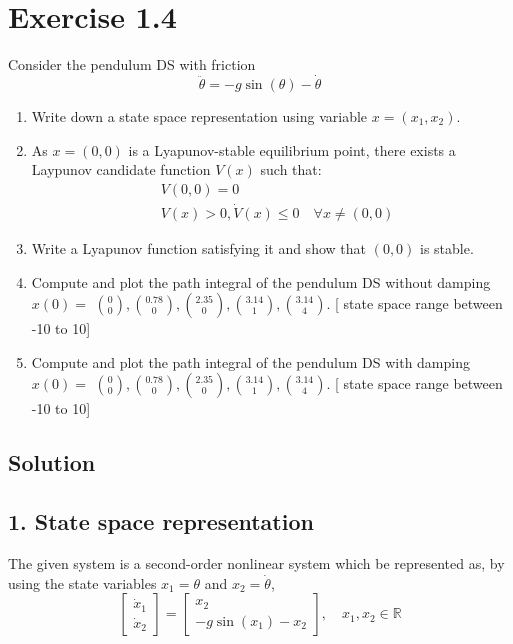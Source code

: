 \section*{Exercise 1.4}

Consider the pendulum DS with friction
\[
    \ddot{\theta}=-g \sin (\theta)-\dot{\theta}
\]
\begin{enumerate}[noitemsep]
    \item Write down a state space representation using variable \( x=\left(x_{1}, x_{2}\right) \).
    \item As \( x=(0,0) \) is a Lyapunov-stable equilibrium point, there exists a Laypunov candidate function \( V(x) \) such that:
          \begin{align*}
               & V(0,0)=0                                            \\
               & V(x)>0, \dot{V}(x) \leq 0 \quad \forall x \neq(0,0)
          \end{align*}
    \item Write a Lyapunov function satisfying it and show that \( (0,0) \) is stable.
    \item Compute and plot the path integral of the pendulum DS without damping \( x(0)= \) \( \binom{0}{0},\binom{0.78}{0},\binom{2.35}{0},\binom{3.14}{1},\binom{3.14}{4} \).
              [ state space range between -10 to 10]
    \item Compute and plot the path integral of the pendulum DS with damping \\
          \( x(0)= \) \( \binom{0}{0},\binom{0.78}{0},\binom{2.35}{0},\binom{3.14}{1},\binom{3.14}{4} \).
              [ state space range between -10 to 10]
\end{enumerate}

\subsection*{Solution}

\subsection*{1. State space representation}

The given system is a second-order nonlinear system which be represented as, by using the state variables \( x_{1} = \theta \) and \( x_{2} = \dot{\theta} \),
\[
    \boxed{
        \begin{bmatrix}
            \dot{x}_{1} \\
            \dot{x}_{2}
        \end{bmatrix}
        =
        \begin{bmatrix}
            x_{2} \\
            -g \sin (x_{1}) - x_{2}
        \end{bmatrix}
        ,\quad x_{1}, x_{2} \in \mathbb{R}
    }
\]

